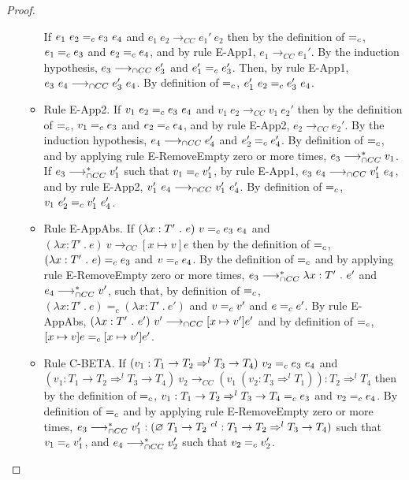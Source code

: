 \documentclass[a4paper]{article}
\begin{document}
\begin{proof}
\begin{itemize}
\begin{itemize}
        If $e_1\ e_2 =_c e_3\ e_4$ and $e_1\ e_2 \longrightarrow_{CC} e_1'\ e_2$ then by the definition of $=_c$, $e_1 =_c e_3$ and $e_2 =_c e_4$, and by rule E-App1, $e_1 \longrightarrow_{CC} e_1'$.
        By the induction hypothesis, $e_3 \longrightarrow_{\cap CC} e_3'$ and $e_1' =_c e_3'$.
        Then, by rule E-App1, $e_3\ e_4 \longrightarrow_{\cap CC} e_3'\ e_4$.
        By definition of $=_c$, $e_1'\ e_2 \equalityCasts e_3'\ e_4$.
        \item Rule E-App2.
        If $v_1\ e_2 =_c e_3\ e_4$ and $v_1\ e_2 \longrightarrow_{CC} v_1\ e_2'$ then by the definition of $=_c$, $v_1 =_c e_3$ and $e_2 =_c e_4$, and by rule E-App2, $e_2 \longrightarrow_{CC} e_2'$.
        By the induction hypothesis, $e_4 \longrightarrow_{\cap CC} e_4'$ and $e_2' =_c e_4'$.
        By definition of $=_c$, and by applying rule E-RemoveEmpty zero or more times, $e_3 \longrightarrow_{\cap CC}^* v_1$.
        If $e_3 \longrightarrow_{\cap CC}^* v_1'$ such that $v_1 =_c v_1'$, by rule E-App1, $e_3\ e_4 \longrightarrow_{\cap CC} v_1'\ e_4$, and by rule E-App2, $v_1'\ e_4 \gios v_1'\ e_4'$.
        By definition of $=_c$, $v_1\ e_2' \equalityCasts v_1'\ e_4'$.
        \item Rule E-AppAbs.
        If $(\lambda x : T'\ .\ e)\ v \equalityCasts e_3\ e_4$ and $(\lambda x : T'\ .\ e)\ v \longrightarrow_{CC} [x \mapsto v]e$ then by the definition of $=_c$, $(\lambda x : T'\ .\ e) =_c e_3$ and $v =_c e_4$.
        By the definition of $=_c$ and by applying rule E-RemoveEmpty zero or more times, $e_3 \longrightarrow_{\cap CC}^* \lambda x : T'\ .\ e'$ and $e_4 \longrightarrow_{\cap CC}^* v'$, such that, by definition of $=_c$, $(\lambda x : T'\ .\ e) = _c (\lambda x : T'\ .\ e')$ and $v =_c v'$ and $e =_c e'$.
        By rule E-AppAbs, $(\lambda x : T'\ .\ e')\ v' \longrightarrow_{\cap CC} [x \mapsto v']e'$ and by definition of $=_c$, $[x \mapsto v]e =_c [x \mapsto v']e'$.
        \item Rule C-BETA.
        If $(v_1 : T_1 \rightarrow T_2 \Rightarrow^l T_3 \rightarrow T_4)\ v_2 \equalityCasts e_3\ e_4$ and $(v_1 : T_1 \rightarrow T_2 \Rightarrow^l T_3 \rightarrow T_4)\ v_2 \longrightarrow_{CC} (v_1\ (v_2 : T_3 \Rightarrow^l T_1)) : T_2 \Rightarrow^l T_4$ then by the definition of $=_c$, $v_1 : T_1 \rightarrow T_2 \Rightarrow^l T_3 \rightarrow T_4 =_c e_3$ and $v_2 =_c e_4$.
        By definition of $=_c$ and by applying rule E-RemoveEmpty zero or more times, $e_3 \longrightarrow_{\cap CC}^* v_1' : (\varnothing\ T_1 \rightarrow T_2\ ^{cl} : T_1 \rightarrow T_2 \Rightarrow^l T_3 \rightarrow T_4)$ such that $v_1 =_c v_1'$, and $e_4 \longrightarrow_{\cap CC}^* v_2'$ such that $v_2 =_c v_2'$.

\end{itemize}
\end{itemize}
\end{proof}
\end{document}
